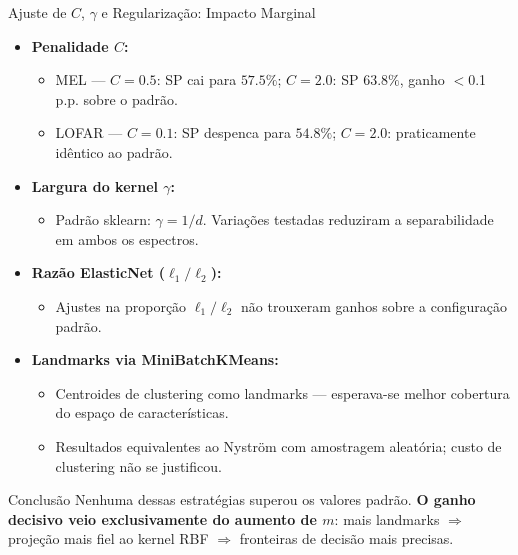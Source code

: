 \documentclass{beamer}
\begin{document}
\begin{frame}{Ajuste de $C$, $\gamma$ e Regularização: Impacto Marginal}
    \scriptsize
    \begin{itemize}
        \setlength{\itemsep}{3pt}

        \item \textbf{Penalidade $C$:}
        \begin{itemize}
            \tiny \setlength{\itemsep}{0pt}
            \item MEL — $C = 0.5$: SP cai para $57.5\%$; $C = 2.0$: SP $63.8\%$, ganho $<$0.1 p.p. sobre o padrão.
            \item LOFAR — $C = 0.1$: SP despenca para $54.8\%$; $C = 2.0$: praticamente idêntico ao padrão.
        \end{itemize}

        \item \textbf{Largura do kernel $\gamma$:}
        \begin{itemize}
            \tiny \setlength{\itemsep}{0pt}
            \item Padrão sklearn: $\gamma = 1/d$. Variações testadas reduziram a separabilidade em ambos os espectros.
        \end{itemize}

        \item \textbf{Razão ElasticNet ($\ell_1 / \ell_2$):}
        \begin{itemize}
            \tiny \setlength{\itemsep}{0pt}
            \item Ajustes na proporção $\ell_1/\ell_2$ não trouxeram ganhos sobre a configuração padrão.
        \end{itemize}

        \item \textbf{Landmarks via MiniBatchKMeans:}
        \begin{itemize}
            \tiny \setlength{\itemsep}{0pt}
            \item Centroides de clustering como landmarks — esperava-se melhor cobertura do espaço de características.
            \item Resultados equivalentes ao Nyström com amostragem aleatória; custo de clustering não se justificou.
        \end{itemize}
    \end{itemize}

    \vspace{0.1cm}
    \begin{block}{\footnotesize Conclusão}
        \scriptsize
        Nenhuma dessas estratégias superou os valores padrão. \textbf{O ganho decisivo veio exclusivamente do aumento de $m$}: mais landmarks $\Rightarrow$ projeção mais fiel ao kernel RBF $\Rightarrow$ fronteiras de decisão mais precisas.
    \end{block}
\end{frame}
\end{document}
